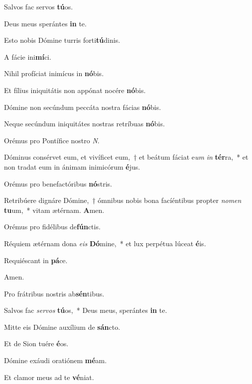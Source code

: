 \item Salvos fac servos \textbf{tú}os.
\item Deus meus sperántes \textbf{in} te.
\item Esto nobis Dómine turris forti\textbf{tú}dinis.
\item A fácie ini\textbf{mí}ci.
\item Nihil profíciat inimícus in \textbf{nó}bis.
\item Et fílius iniquitátis non appónat nocére \textbf{nó}bis.
\item Dómine non secúndum peccáta nostra fácias \textbf{nó}bis.
\item Neque secúndum iniquitátes nostras retríbuas \textbf{nó}bis.
\item Orémus pro Pontífice nostro \emph{N}.
\item Dóminus consérvet eum, et vivíficet eum,~† et beátum fáciat e\emph{um} \emph{in} \textbf{tér}ra,~* et non tradat eum in ánimam inimicórum \textbf{é}jus.
\item Orémus pro benefactóribus \textbf{nó}stris.
\item Retribúere dignáre Dó\-mi\-ne,~† ómnibus nobis bona fa\-cí\-én\-ti\-bus propter \emph{no}\emph{men} \textbf{tu}\-um,~* vitam ætérnam. \textbf{A}men.
\item Orémus pro fidélibus de\textbf{fún}\-ctis.
\item Réquiem ætérnam dona \emph{e}\emph{is} \textbf{Dó}mine,~* et lux perpétua lúceat \textbf{é}is.
\item Requiéscant in \textbf{pá}ce.
\item Amen.
\item Pro frátribus nostris ab\textbf{sén}tibus.
\item Salvos fac \emph{ser}\emph{vos} \textbf{tú}os,~* Deus meus, sperántes \textbf{in} te.
\item Mitte eis Dómine auxílium de \textbf{sán}cto.
\item Et de Sion tuére \textbf{é}os.
\item Dómine exáudi oratiónem \textbf{mé}am.
\item Et clamor meus ad te \textbf{vé}niat.
